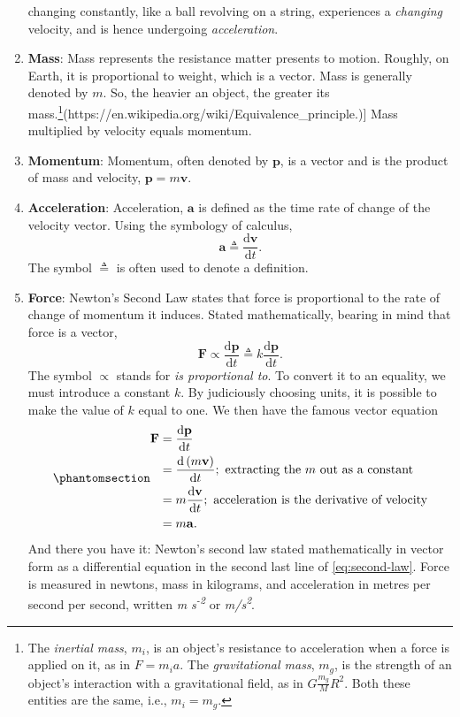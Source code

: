 \documentclass[
  a4paper,
]{article}
\begin{document}
\begin{enumerate}
  changing constantly, like a ball revolving on a string, experiences a
  \emph{changing} velocity, and is hence undergoing \emph{acceleration}.
\item
  \textbf{Mass}: Mass represents the resistance matter presents to
  motion. Roughly, on Earth, it is proportional to weight, which is a
  vector. Mass is generally denoted by \(m\). So, the heavier an object,
  the greater its
  mass.\footnote{The \emph{inertial mass}, \(m_i\), is an object's
    resistance to acceleration when a force is applied on it, as in
    \(F = m_{i}a\). The \emph{gravitational mass}, \(m_g\), is the
    strength of an object's interaction with a gravitational field, as
    in \(G\frac{m_g}{M}{R^2}\). Both these entities are the same, i.e.,
    \(m_{i} = m_{g}\).}(https://en.wikipedia.org/wiki/Equivalence\_principle.){]}
  Mass multiplied by velocity equals momentum.
\item
  \textbf{Momentum}: Momentum, often denoted by \(\mathbf{p}\), is a
  vector and is the product of mass and velocity,
  \(\mathbf{p} = m\mathbf{v}\).
\item
  \textbf{Acceleration}: Acceleration, \(\mathbf{a}\) is defined as the
  time rate of change of the velocity vector. Using the symbology of
  calculus, \[
  \mathbf{a} \triangleq \frac{\mathrm{d}\mathbf{v}}{\mathrm{d}t}.
  \] The symbol \(\triangleq\) is often used to denote a definition.
\item
  \textbf{Force}: Newton's Second Law states that force is proportional
  to the rate of change of momentum it induces. Stated mathematically,
  bearing in mind that force is a vector, \[
  \mathbf{F} \propto \frac{\mathrm{d}\mathbf{p}}{\mathrm{d}t} \triangleq k\frac{\mathrm{d}\mathbf{p}}{\mathrm{d}t}.
  \] The symbol \(\propto\) stands for \emph{is proportional to}. To
  convert it to an equality, we must introduce a constant \(k\). By
  judiciously choosing units, it is possible to make the value of \(k\)
  equal to one. We then have the famous vector equation
  \begin{equation}\phantomsection\label{eq:second-law}{
  \begin{aligned}
  \mathbf{F} &= \frac{\mathrm{d}\mathbf{p}}{\mathrm{d}t}\\
  &= \frac{\mathrm{d}\left(m\mathbf{v}\right)}{\mathrm{d}t}; \text{ extracting the $m$ out as a constant}\\
  &= m\frac{\mathrm{d}\mathbf{v}}{\mathrm{d}t}; \text{ acceleration is the derivative of velocity}\\
  &= m\mathbf{a}.
  \end{aligned}
  }\end{equation} And there you have it: Newton's second law stated
  mathematically in vector form as a differential equation in the second
  last line of \cref{eq:second-law}. Force is measured in newtons, mass
  in kilograms, and acceleration in metres per second per second,
  written \emph{m s\textsuperscript{-2}} or
  \emph{m/s\textsuperscript{2}}.
\end{enumerate}
\end{document}
